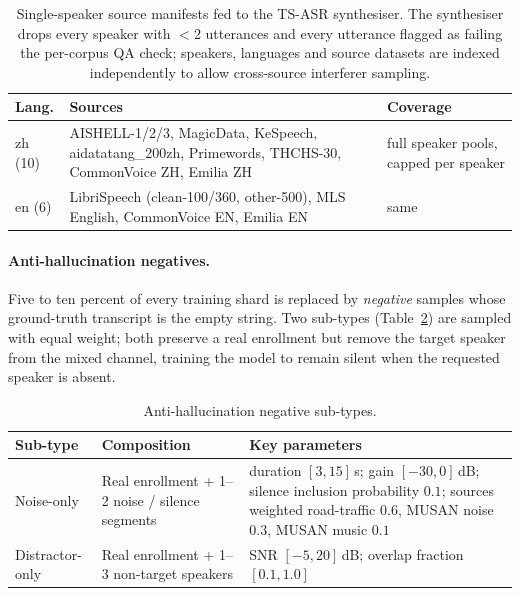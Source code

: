 \begin{table}[t]
  \caption{Single-speaker source manifests fed to the TS-ASR
    synthesiser. The synthesiser drops every speaker with $<\!2$
    utterances and every utterance flagged as failing the per-corpus
    QA check; speakers, languages and source datasets are indexed
    independently to allow cross-source interferer sampling.}
  \label{tab:tsasr_sources}
  \centering
  \small
  \begin{tabular}{lp{6.0cm}p{3.5cm}}
    \toprule
    Lang. & Sources & Coverage \\
    \midrule
    zh (10) & AISHELL-1/2/3, MagicData, KeSpeech, aidatatang\_200zh, Primewords, THCHS-30, CommonVoice ZH, Emilia ZH & full speaker pools, capped per speaker \\
    en (6)  & LibriSpeech (clean-100/360, other-500), MLS English, CommonVoice EN, Emilia EN & same \\
    \bottomrule
  \end{tabular}
\end{table}

\paragraph{Anti-hallucination negatives.}
Five to ten percent of every training shard is replaced by
\emph{negative} samples whose ground-truth transcript is the empty
string. Two sub-types (Table~\ref{tab:tsasr_negatives}) are sampled
with equal weight; both preserve a real enrollment but remove the
target speaker from the mixed channel, training the model to remain
silent when the requested speaker is absent.

\begin{table}[t]
  \caption{Anti-hallucination negative sub-types.}
  \label{tab:tsasr_negatives}
  \centering
  \small
  \setlength{\tabcolsep}{4pt}
  \begin{tabular}{lp{4.5cm}p{6.5cm}}
    \toprule
    Sub-type & Composition & Key parameters \\
    \midrule
    Noise-only       & Real enrollment + 1--2 noise / silence segments & duration $[3,15]$\,s; gain $[-30, 0]$\,dB; silence inclusion probability $0.1$; sources weighted road-traffic $0.6$, MUSAN noise $0.3$, MUSAN music $0.1$ \\
    Distractor-only  & Real enrollment + 1--3 non-target speakers      & SNR $[-5, 20]$\,dB; overlap fraction $[0.1, 1.0]$ \\
    \bottomrule
  \end{tabular}
\end{table}

